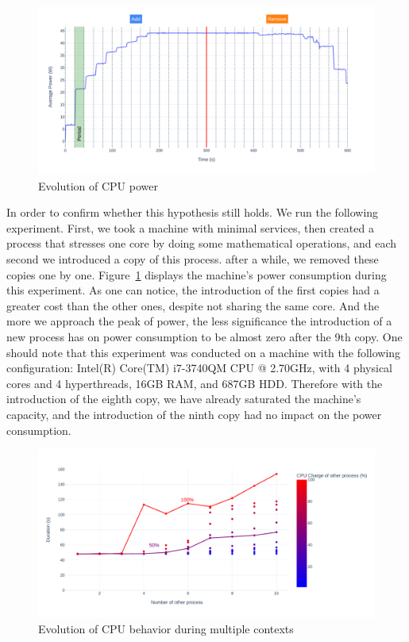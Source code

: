 \begin{figure}[!h]
      \centering
      \caption{Evolution of CPU power}
      \label{fig:power_evolution_greenfaas}
      \includegraphics[width=\linewidth]{chapters/power_evolution_greenfaas}
\end{figure}

In order to confirm whether this hypothesis still holds. We run the following experiment.
First, we took a machine with minimal services, then created a process that stresses one core by doing some mathematical operations, and each second we introduced a copy of this process. after a while, we removed these copies one by one.
Figure~\ref{fig:power_evolution_greenfaas} displays the machine's power consumption during this experiment. As one can notice, the introduction of the first copies had a greater cost than the other ones, despite not sharing the same core. And the more we approach the peak of power, the less significance the introduction of a new process has on power consumption to be almost zero after the 9th copy.
One should note that this experiment was conducted on a machine with the following configuration:
Intel(R) Core(TM) i7-3740QM CPU @ 2.70GHz, with 4 physical cores and 4 hyperthreads, 16GB RAM, and 687GB HDD.
Therefore with the introduction of the eighth copy, we have already saturated the machine's capacity, and the introduction of the ninth copy had no impact on the power consumption.






\begin{figure}[!h]
      \centering
      \caption{Evolution of CPU behavior during multiple contexts }
      \label{fig:green_faas}
      \includegraphics[width=\linewidth]{chapters/green_faas_duration}
\end{figure}

